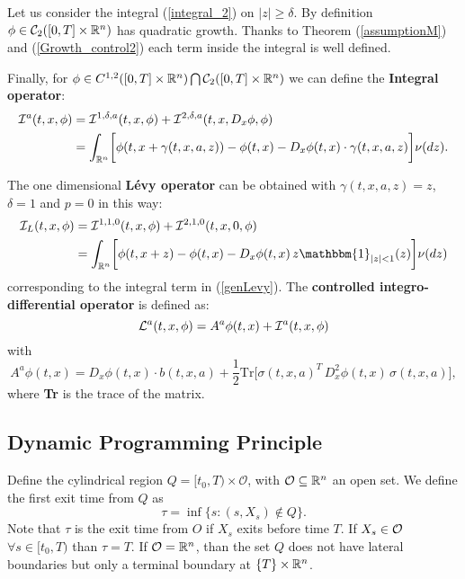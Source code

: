 Let us consider the integral (\ref{integral_2}) on $|z|\geq \delta$. By definition $\phi \in \mathcal{C}_2([0,T] \times \mathbb{R}^n) $ has quadratic growth.
Thanks to Theorem (\ref{assumptionM}) and (\ref{Growth_control2}) each term inside the integral is well defined.

Finally, for $\phi \in C^{1,2}([0,T] \times \mathbb{R}^n) \bigcap \mathcal{C}_2([0,T] \times \mathbb{R}^n)$ we can define the 
\textbf{Integral operator}:
\begin{align}\label{int_oper}
 \mathcal{I}^{a}(t,x,\phi) &= \mathcal{I}^{1,\delta,a}(t,x,\phi) + \mathcal{I}^{2,\delta,a}(t,x,D_x \phi,\phi)\\ \nonumber
 &= \int_{\mathbb{R}^n}
\biggl[ \phi(t,x + \gamma(t,x,a,z)) - \phi(t,x) - D_x \phi(t,x) \cdot \gamma(t,x,a,z) \biggr] \nu(dz). 
\end{align}

\noindent
The one dimensional \textbf{Lévy operator} can be obtained with $\gamma(t,x,a,z) = z$, $\delta = 1$ and $p=0$ in this way:
\begin{align*}
\mathcal{I}_L(t,x,\phi) &= \mathcal{I}^{1,1,0}(t,x,\phi) + \mathcal{I}^{2,1,0}(t,x,0,\phi)\\  
                   &= \int_{\R^n} \biggl[ \phi(t,x+ z) - \phi(t,x) - D_x \phi(t,x)\, z \mathbbm{1}_{|z|<1}(z) \biggr] \nu(dz) 
\end{align*}
corresponding to the integral term in (\ref{genLevy}).
The \textbf{controlled integro-differential operator} is defined as:
\begin{equation}\label{int_diff_oper}
 \mathcal{L}^{a}(t,x,\phi) = A^{a} \phi(t,x) + \mathcal{I}^{a}(t,x,\phi)
\end{equation}
with 
$$A^{a} \phi(t,x) = D_x \phi(t,x) \cdot b(t,x,a) + \frac{1}{2} \mbox{Tr} \biggl[ \sigma(t,x,a)^T \, D_x^2 \phi(t,x) \, \sigma(t,x,a) \biggr], $$
where \textbf{Tr} is the trace of the matrix.

\subsection{Dynamic Programming Principle}

Define the cylindrical region $Q = [t_0,T) \times \mathcal{O}$, with $\mathcal{O} \subseteq \mathbb{R}^n$ an open set. 
We define the first exit time from $Q$ as 
\begin{equation}\label{exit_time_def}
 \tau = \inf \{ s: (s,X_s) \not\in Q \}. 
\end{equation}
Note that $\tau$ is the exit time from $O$ if $X_s$ exits before time $T$. If $X_s \in \mathcal{O}$ $\forall s \in [t_0,T)$ than $\tau = T$. If $\mathcal{O} = \mathbb{R}^n$, than the set $Q$ 
does not have lateral boundaries but only a terminal boundary at $\{ T \} \times \mathbb{R}^n$.


